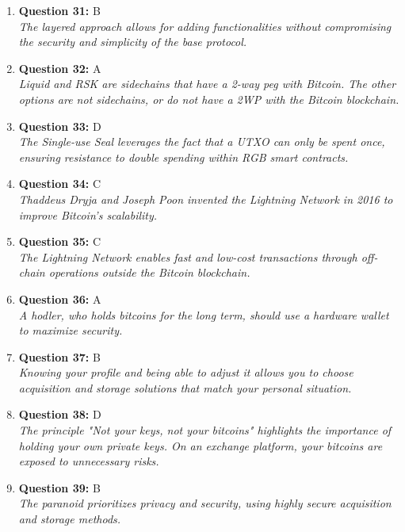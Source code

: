 \documentclass[12pt,a4paper]{article}
\begin{document}
\begin{enumerate}
\item \textbf{Question 31:} B
\\ \textit{The layered approach allows for adding functionalities without compromising the security and simplicity of the base protocol.}

\item \textbf{Question 32:} A
\\ \textit{Liquid and RSK are sidechains that have a 2-way peg with Bitcoin. The other options are not sidechains, or do not have a 2WP with the Bitcoin blockchain.}

\item \textbf{Question 33:} D
\\ \textit{The Single-use Seal leverages the fact that a UTXO can only be spent once, ensuring resistance to double spending within RGB smart contracts.}

\item \textbf{Question 34:} C
\\ \textit{Thaddeus Dryja and Joseph Poon invented the Lightning Network in 2016 to improve Bitcoin's scalability.}

\item \textbf{Question 35:} C
\\ \textit{The Lightning Network enables fast and low-cost transactions through off-chain operations outside the Bitcoin blockchain.}

\item \textbf{Question 36:} A
\\ \textit{A hodler, who holds bitcoins for the long term, should use a hardware wallet to maximize security.}

\item \textbf{Question 37:} B
\\ \textit{Knowing your profile and being able to adjust it allows you to choose acquisition and storage solutions that match your personal situation.}

\item \textbf{Question 38:} D
\\ \textit{The principle "Not your keys, not your bitcoins" highlights the importance of holding your own private keys. On an exchange platform, your bitcoins are exposed to unnecessary risks.}

\item \textbf{Question 39:} B
\\ \textit{The paranoid prioritizes privacy and security, using highly secure acquisition and storage methods.}


\end{enumerate}
\end{document}
